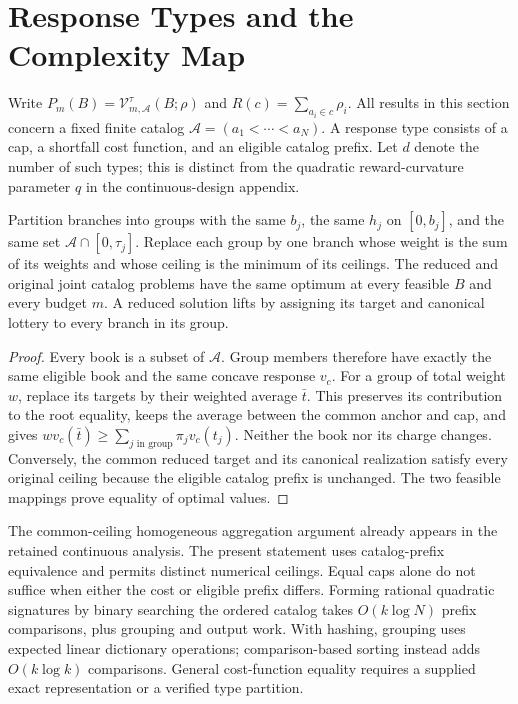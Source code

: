 \section{Response Types and the Complexity Map}\label{sec:r46-types}
Write $P_m(B)=\mathcal V_{m,\mathcal A}^{\tau}(B;\rho)$ and $R(c)=\sum_{a_i\in c}\rho_i$. All results in this section concern a fixed finite catalog $\mathcal A=(a_1<\cdots<a_N)$. A response type consists of a cap, a shortfall cost function, and an eligible catalog prefix. Let $d$ denote the number of such types; this is distinct from the quadratic reward-curvature parameter $q$ in the continuous-design appendix.

\begin{proposition}\label{prop:r46-types}
Partition branches into groups with the same $b_j$, the same $h_j$ on $[0,b_j]$, and the same set $\mathcal A\cap[0,\tau_j]$. Replace each group by one branch whose weight is the sum of its weights and whose ceiling is the minimum of its ceilings. The reduced and original joint catalog problems have the same optimum at every feasible $B$ and every budget $m$. A reduced solution lifts by assigning its target and canonical lottery to every branch in its group.
\end{proposition}
\begin{proof}
Every book is a subset of $\mathcal A$. Group members therefore have exactly the same eligible book and the same concave response $v_c$. For a group of total weight $w$, replace its targets by their weighted average $\bar t$. This preserves its contribution to the root equality, keeps the average between the common anchor and cap, and gives
$w v_c(\bar t)\geq\sum_{j\text{ in group}}\pi_jv_c(t_j)$.
Neither the book nor its charge changes. Conversely, the common reduced target and its canonical realization satisfy every original ceiling because the eligible catalog prefix is unchanged. The two feasible mappings prove equality of optimal values.
\end{proof}
The common-ceiling homogeneous aggregation argument already appears in the retained continuous analysis. The present statement uses catalog-prefix equivalence and permits distinct numerical ceilings. Equal caps alone do not suffice when either the cost or eligible prefix differs. Forming rational quadratic signatures by binary searching the ordered catalog takes $O(k\log N)$ prefix comparisons, plus grouping and output work. With hashing, grouping uses expected linear dictionary operations; comparison-based sorting instead adds $O(k\log k)$ comparisons. General cost-function equality requires a supplied exact representation or a verified type partition.

